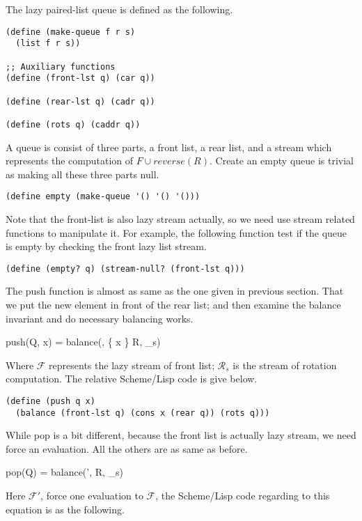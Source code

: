 \documentclass{article}
\begin{document}
The lazy paired-list queue is defined as the following.

\lstset{language=Lisp}
\begin{lstlisting}
(define (make-queue f r s)
  (list f r s))

;; Auxiliary functions
(define (front-lst q) (car q))

(define (rear-lst q) (cadr q))

(define (rots q) (caddr q))
\end{lstlisting}

A queue is consist of three parts, a front list, a rear list,
and a stream which represents the computation of $F \cup reverse(R)$.
Create an empty queue is trivial as making all these three parts
null.

\begin{lstlisting}
(define empty (make-queue '() '() '()))
\end{lstlisting}

Note that the front-list is also lazy stream actually, so we need use
stream related functions to manipulate it. For example, the following
function test if the queue is empty by checking the front lazy list stream.

\begin{lstlisting}
(define (empty? q) (stream-null? (front-lst q)))
\end{lstlisting}

The push function is almost as same as the one given in previous section.
That we put the new element in front of the rear list; and then examine
the balance invariant and do necessary balancing works.

\be
push(Q, x) = balance(, \{ x \} \cup R, _s)
\ee

Where $\mathcal{F}$ represents the lazy stream of front list; $\mathcal{R}_s$ is
the stream of rotation computation. The relative Scheme/Lisp
code is give below.

\begin{lstlisting}
(define (push q x)
  (balance (front-lst q) (cons x (rear q)) (rots q)))
\end{lstlisting}

While pop is a bit different, because the front list is actually lazy stream,
we need force an evaluation. All the others are as same as before.

\be
pop(Q) = balance(', R, _s)
\ee

Here $\mathcal{F}'$, force one evaluation to $\mathcal{F}$, the Scheme/Lisp
code regarding to this equation is as the following.
\end{document}
